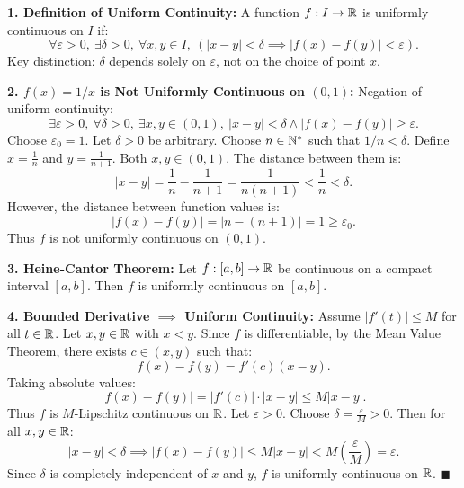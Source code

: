 \begin{tabletworkspace}[5.5cm]
\end{tabletworkspace}

\begin{solution}
\textbf{1. Definition of Uniform Continuity:}
A function $f: I \to \mathbb{R}$ is uniformly continuous on $I$ if:
\[
\forall \varepsilon > 0,\ \exists \delta > 0,\ \forall x, y \in I,\ (|x - y| < \delta \implies |f(x) - f(y)| < \varepsilon).
\]
Key distinction: $\delta$ depends solely on $\varepsilon$, not on the choice of point $x$.

\textbf{2. $f(x) = 1/x$ is Not Uniformly Continuous on $(0, 1)$:}
Negation of uniform continuity:
\[
\exists \varepsilon > 0,\ \forall \delta > 0,\ \exists x, y \in (0, 1),\ |x - y| < \delta \land |f(x) - f(y)| \ge \varepsilon.
\]
Choose $\varepsilon_0 = 1$. Let $\delta > 0$ be arbitrary.
Choose $n \in \mathbb{N}^*$ such that $1/n < \delta$.
Define $x = \frac{1}{n}$ and $y = \frac{1}{n+1}$. Both $x, y \in (0, 1)$.
The distance between them is:
\[
|x - y| = \frac{1}{n} - \frac{1}{n+1} = \frac{1}{n(n+1)} < \frac{1}{n} < \delta.
\]
However, the distance between function values is:
\[
|f(x) - f(y)| = \left| n - (n+1) \right| = 1 \ge \varepsilon_0.
\]
Thus $f$ is not uniformly continuous on $(0, 1)$.

\textbf{3. Heine-Cantor Theorem:}
Let $f: [a, b] \to \mathbb{R}$ be continuous on a compact interval $[a, b]$. Then $f$ is uniformly continuous on $[a, b]$.

\textbf{4. Bounded Derivative $\implies$ Uniform Continuity:}
Assume $|f'(t)| \le M$ for all $t \in \mathbb{R}$.
Let $x, y \in \mathbb{R}$ with $x < y$.
Since $f$ is differentiable, by the Mean Value Theorem, there exists $c \in (x, y)$ such that:
\[
f(x) - f(y) = f'(c)(x - y).
\]
Taking absolute values:
\[
|f(x) - f(y)| = |f'(c)| \cdot |x - y| \le M |x - y|.
\]
Thus $f$ is $M$-Lipschitz continuous on $\mathbb{R}$.
Let $\varepsilon > 0$. Choose $\delta = \frac{\varepsilon}{M} > 0$.
Then for all $x, y \in \mathbb{R}$:
\[
|x - y| < \delta \implies |f(x) - f(y)| \le M |x - y| < M \left(\frac{\varepsilon}{M}\right) = \varepsilon.
\]
Since $\delta$ is completely independent of $x$ and $y$, $f$ is uniformly continuous on $\mathbb{R}$. \hfill $\blacksquare$
\end{solution}
